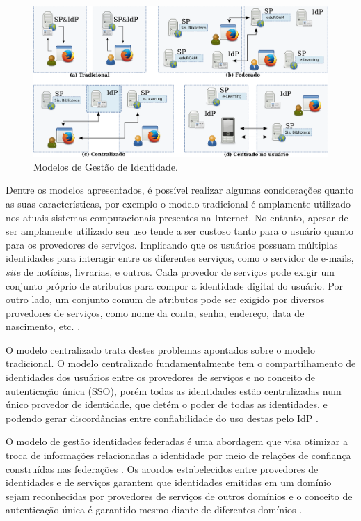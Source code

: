 \begin{figure}[!ht]
 \centering
 \includegraphics[width=1\textwidth]{figuras/modelos-gid.png}
 \caption{Modelos de Gestão de Identidade.}
 \label{fig_1}
\end{figure}

Dentre os modelos apresentados, é possível realizar algumas considerações quanto as suas características, por exemplo o modelo tradicional é amplamente utilizado nos atuais sistemas computacionais presentes na Internet. No entanto, apesar de ser amplamente utilizado seu uso tende a ser custoso tanto para o usuário quanto para os provedores de serviços. Implicando que os usuários possuam múltiplas identidades para interagir entre os diferentes serviços, como o servidor de e-mails, \textit{site} de notícias, livrarias, e outros. Cada provedor de serviços pode exigir um conjunto próprio de atributos para compor a identidade digital do usuário. Por outro lado, um conjunto comum de atributos pode ser exigido por diversos provedores de serviços, como nome da conta, senha, endereço, data de nascimento, etc. \cite{mello:09}.

O modelo centralizado trata destes problemas apontados sobre o modelo tradicional. O modelo centralizado fundamentalmente tem o compartilhamento de identidades dos usuários entre os provedores de serviços e no conceito de autenticação única (SSO), porém todas as identidades estão centralizadas num único  provedor de identidade, que detém o poder de todas as identidades, e podendo gerar discordâncias entre confiabilidade do uso destas pelo IdP \cite{wangham:10b}.

O modelo de gestão identidades federadas é uma abordagem que visa otimizar a troca de informações relacionadas a identidade por meio de relações de confiança construídas nas federações \cite{camenisch:07}. Os acordos estabelecidos entre provedores de identidades e de serviços garantem que identidades emitidas em um domínio sejam reconhecidas por provedores de serviços de outros domínios e o conceito de autenticação única é garantido mesmo diante de diferentes domínios \cite{wangham:10b}.


